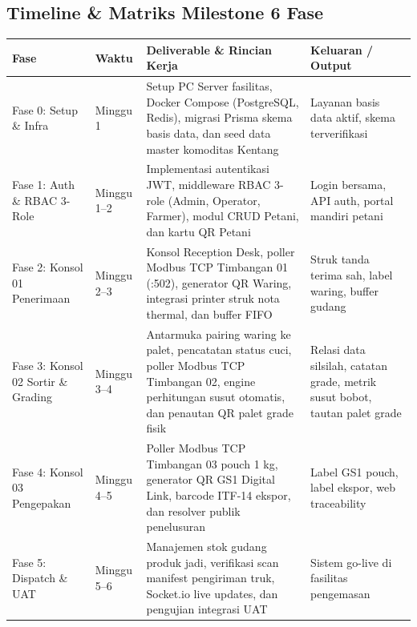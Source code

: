 \documentclass[12pt,a4paper]{article}
\begin{document}
\subsection{Timeline \& Matriks Milestone 6 Fase}

\begin{longtable}{@{}>{\raggedright\arraybackslash}p{2.6cm}>{\raggedright\arraybackslash}p{2.0cm}>{\raggedright\arraybackslash}p{6.6cm}>{\raggedright\arraybackslash}p{3.8cm}@{}}
\toprule
\textbf{Fase} & \textbf{Waktu} & \textbf{Deliverable \& Rincian Kerja} & \textbf{Keluaran / Output} \\
\midrule
\endhead
Fase 0: Setup \& Infra & Minggu 1 & Setup PC Server fasilitas, Docker Compose (PostgreSQL, Redis), migrasi Prisma skema basis data, dan seed data master komoditas Kentang & Layanan basis data aktif, skema terverifikasi \\
\hline
Fase 1: Auth \& RBAC 3-Role & Minggu 1--2 & Implementasi autentikasi JWT, middleware RBAC 3-role (Admin, Operator, Farmer), modul CRUD Petani, dan kartu QR Petani & Login bersama, API auth, portal mandiri petani \\
\hline
Fase 2: Konsol 01 Penerimaan & Minggu 2--3 & Konsol Reception Desk, poller Modbus TCP Timbangan 01 (:502), generator QR Waring, integrasi printer struk nota thermal, dan buffer FIFO & Struk tanda terima sah, label waring, buffer gudang \\
\hline
Fase 3: Konsol 02 Sortir \& Grading & Minggu 3--4 & Antarmuka pairing waring ke palet, pencatatan status cuci, poller Modbus TCP Timbangan 02, engine perhitungan susut otomatis, dan penautan QR palet grade fisik & Relasi data silsilah, catatan grade, metrik susut bobot, tautan palet grade \\
\hline
Fase 4: Konsol 03 Pengepakan & Minggu 4--5 & Poller Modbus TCP Timbangan 03 pouch 1 kg, generator QR GS1 Digital Link, barcode ITF-14 ekspor, dan resolver publik penelusuran & Label GS1 pouch, label ekspor, web traceability \\
\hline
Fase 5: Dispatch \& UAT & Minggu 5--6 & Manajemen stok gudang produk jadi, verifikasi scan manifest pengiriman truk, Socket.io live updates, dan pengujian integrasi UAT & Sistem go-live di fasilitas pengemasan \\
\bottomrule
\end{longtable}
\end{document}
